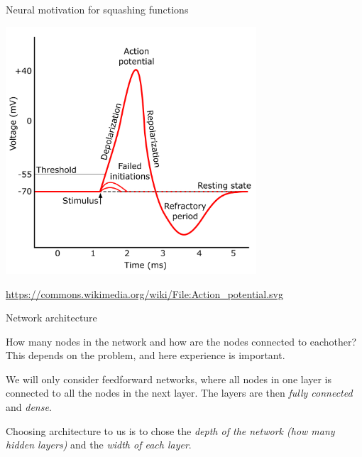 \documentclass[10pt,ignorenonframetext,]{beamer}
\begin{document}
\begin{frame}

\begin{block}{Neural motivation for squashing functions}

\centering

\includegraphics[width=0.7\textwidth,height=\textheight]{Action_potential.png}

\url{https://commons.wikimedia.org/wiki/File:Action_potential.svg}

\end{block}

\end{frame}

\begin{frame}

\begin{block}{Network architecture}

How many nodes in the network and how are the nodes connected to
eachother? This depends on the problem, and here experience is
important.

We will only consider feedforward networks, where all nodes in one layer
is connected to all the nodes in the next layer. The layers are then
\emph{fully connected} and \emph{dense}.

Choosing architecture to us is to chose the \emph{depth of the network
(how many hidden layers)} and the \emph{width of each layer}.

\end{block}

\end{frame}
\end{document}
